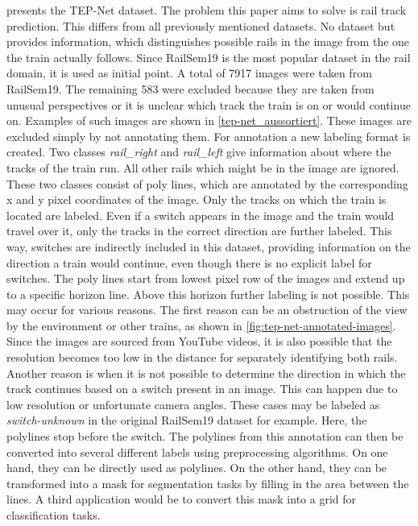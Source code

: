 \cite{tepNet2024} presents the \ac{TEP}-Net dataset.
The problem this paper aims to solve is rail track prediction.
This differs from all previously mentioned datasets.
No dataset but \cite{tepNet2024} provides information, which distinguishes possible rails in the image from the one the train actually follows.
Since RailSem19 is the most popular dataset in the rail domain, it is used as initial point.
A total of 7917 images were taken from RailSem19.
The remaining 583 were excluded because they are taken from unusual perspectives or it is unclear which track the train is on or would continue on.
Examples of such images are shown in \ref{tep-net_aussortiert}.
These images are excluded simply by not annotating them.
For annotation a new labeling format is created.
Two classes \textit{rail\_right} and \textit{rail\_left} give information about where the tracks of the train  run.
All other rails which might be in the image are ignored.
These two classes consist of poly lines, which are annotated by the corresponding x and y pixel coordinates of the image.
Only the tracks on which the train is located are labeled.
Even if a switch appears in the image and the train would travel over it, only the tracks in the correct direction are further labeled.
This way, switches are indirectly included in this dataset, providing information on the direction a train would continue, even though there is no explicit label for switches.
The poly lines start from lowest pixel row of the images and extend up to a specific horizon line.
Above this horizon further labeling is not possible.
This may occur for various reasons.
The first reason can be an obstruction of the view by the environment or other trains, as shown in \ref{fig:tep-net-annotated-images}.
Since the images are sourced from YouTube videos, it is also possible that the resolution becomes too low in the distance for separately identifying both rails.
Another reason is when it is not possible to determine the direction in which the track continues based on a switch present in an image.
This can happen due to low resolution or unfortunate camera angles.
These cases may be labeled as \textit{switch-unknown} in the original RailSem19 dataset for example.
Here, the polylines stop before the switch.
The polylines from this annotation can then be converted into several different labels using preprocessing algorithms.
On one hand, they can be directly used as polylines.
On the other hand, they can be transformed into a mask for segmentation tasks by filling in the area between the lines.
A third application would be to convert this mask into a grid for classification tasks.

